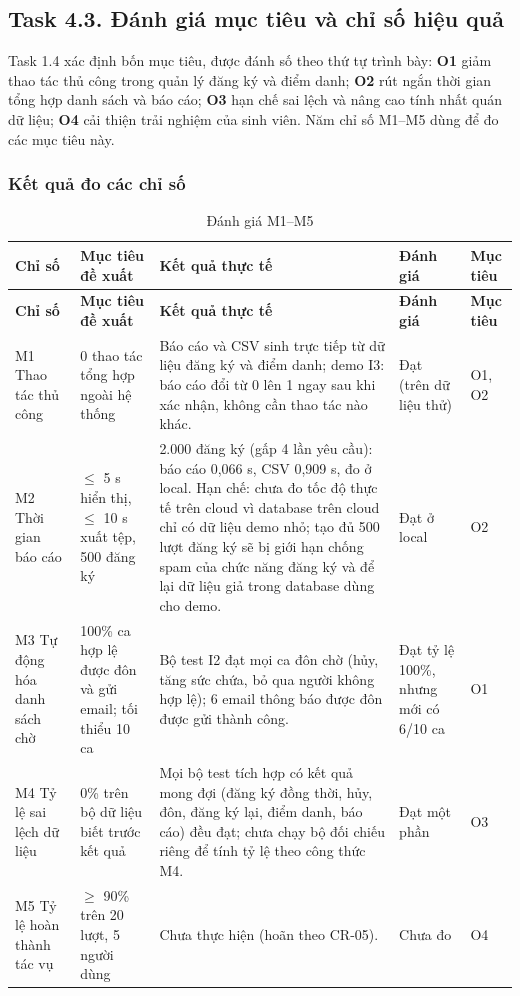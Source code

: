 \subsection{Task 4.3. Đánh giá mục tiêu và chỉ số hiệu quả}
\label{sec:t4-objectives}

Task 1.4 xác định bốn mục tiêu, được đánh số theo thứ tự trình bày: \textbf{O1} giảm thao tác thủ công trong quản lý đăng ký và điểm danh; \textbf{O2} rút ngắn thời gian tổng hợp danh sách và báo cáo; \textbf{O3} hạn chế sai lệch và nâng cao tính nhất quán dữ liệu; \textbf{O4} cải thiện trải nghiệm của sinh viên. Năm chỉ số M1--M5 dùng để đo các mục tiêu này.

\subsubsection{Kết quả đo các chỉ số}

\begingroup\small
\renewcommand{\arraystretch}{1.15}
\begin{longtable}{@{}p{.11\linewidth}p{.19\linewidth}p{.33\linewidth}p{.12\linewidth}p{.15\linewidth}@{}}
\caption{Đánh giá M1--M5}\label{tab:t4-measures}\\
\toprule
\textbf{Chỉ số} & \textbf{Mục tiêu đề xuất} & \textbf{Kết quả thực tế} & \textbf{Đánh giá} & \textbf{Mục tiêu}\\\midrule\endfirsthead
\toprule
\textbf{Chỉ số} & \textbf{Mục tiêu đề xuất} & \textbf{Kết quả thực tế} & \textbf{Đánh giá} & \textbf{Mục tiêu}\\\midrule\endhead
\bottomrule\endfoot
M1 Thao tác thủ công & 0 thao tác tổng hợp ngoài hệ thống & Báo cáo và CSV sinh trực tiếp từ dữ liệu đăng ký và điểm danh; demo I3: báo cáo đổi từ 0 lên 1 ngay sau khi xác nhận, không cần thao tác nào khác. & Đạt (trên dữ liệu thử) & O1, O2\\
M2 Thời gian báo cáo & $\le$ 5 s hiển thị, $\le$ 10 s xuất tệp, 500 đăng ký & 2.000 đăng ký (gấp 4 lần yêu cầu): báo cáo 0,066 s, CSV 0,909 s, đo ở local. Hạn chế: chưa đo tốc độ thực tế trên cloud vì database trên cloud chỉ có dữ liệu demo nhỏ; tạo đủ 500 lượt đăng ký sẽ bị giới hạn chống spam của chức năng đăng ký và để lại dữ liệu giả trong database dùng cho demo. & Đạt ở local & O2\\
M3 Tự động hóa danh sách chờ & 100\% ca hợp lệ được đôn và gửi email; tối thiểu 10 ca & Bộ test I2 đạt mọi ca đôn chờ (hủy, tăng sức chứa, bỏ qua người không hợp lệ); 6 email thông báo được đôn được gửi thành công. & Đạt tỷ lệ 100\%, nhưng mới có 6/10 ca & O1\\
M4 Tỷ lệ sai lệch dữ liệu & 0\% trên bộ dữ liệu biết trước kết quả & Mọi bộ test tích hợp có kết quả mong đợi (đăng ký đồng thời, hủy, đôn, đăng ký lại, điểm danh, báo cáo) đều đạt; chưa chạy bộ đối chiếu riêng để tính tỷ lệ theo công thức M4. & Đạt một phần & O3\\
M5 Tỷ lệ hoàn thành tác vụ & $\ge$ 90\% trên 20 lượt, 5 người dùng & Chưa thực hiện (hoãn theo CR-05). & Chưa đo & O4\\
\end{longtable}
\endgroup


